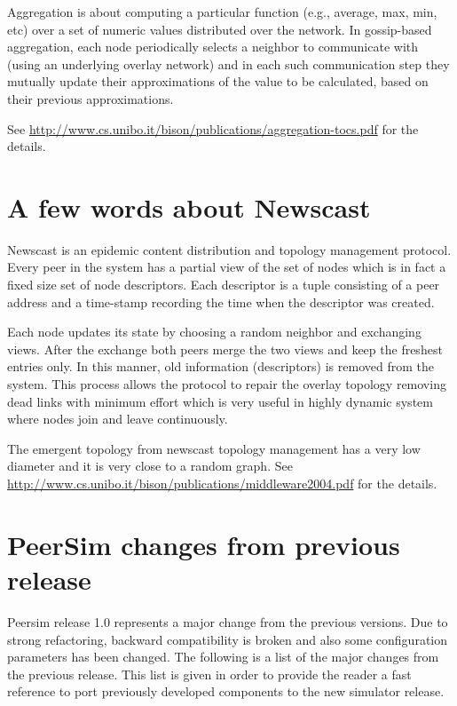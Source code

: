 \documentclass[a4paper,11pt]{article}
\begin{document}
Aggregation is about computing a particular
function (e.g., average, max, min, etc) over a set of numeric values
distributed over the network.
In gossip-based aggregation, each node periodically selects a neighbor
to communicate with (using an underlying overlay network) and
in each such communication step they mutually update their approximations
of the value to be calculated, based on their previous approximations.

See \url{http://www.cs.unibo.it/bison/publications/aggregation-tocs.pdf}
for the details.


\section{\label{sec:Appendix-B-newscast}A few words about Newscast}

Newscast is an epidemic content distribution and topology management
protocol. Every peer in the system has a partial view of
the set of nodes which is in fact a fixed size set of node descriptors.
Each descriptor is a tuple consisting of a peer address and a time-stamp
recording the time when the descriptor was created.

Each node updates its state by choosing a random neighbor and exchanging
views. After the exchange both peers merge the two views and keep the
freshest entries only.
In this manner,
old information (descriptors) is removed from the system.
This process allows the protocol to repair the overlay
topology removing dead links with minimum effort which is very useful
in highly dynamic system where nodes join and leave continuously. 

The emergent topology from newscast topology management has a very
low diameter and it is very close to a random graph.
See \url{http://www.cs.unibo.it/bison/publications/middleware2004.pdf}
for the details.

\section{\label{sec:Appendix-C-changes}PeerSim changes from previous release}

Peersim release 1.0 represents a major change from the previous
versions. 
Due to strong refactoring, backward compatibility is broken and also
some configuration parameters has been changed. 
The following is a list of the major changes from the previous
release. This list is given in order to provide the reader a fast reference to
port previously developed components to the new simulator release.
\end{document}
